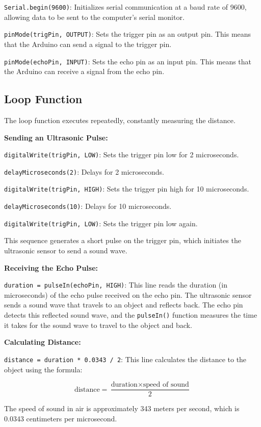 \documentclass{article}
\begin{document}
\texttt{Serial.begin(9600)}: Initializes serial communication at a baud rate of 9600, allowing data to be sent to the computer's serial monitor.

\texttt{pinMode(trigPin, OUTPUT)}: Sets the trigger pin as an output pin. This means that the Arduino can send a signal to the trigger pin.

\texttt{pinMode(echoPin, INPUT)}: Sets the echo pin as an input pin. This means that the Arduino can receive a signal from the echo pin.

\subsection{Loop Function}

The loop function executes repeatedly, constantly measuring the distance.

\textbf{Sending an Ultrasonic Pulse:}

\texttt{digitalWrite(trigPin, LOW)}: Sets the trigger pin low for 2 microseconds.

\texttt{delayMicroseconds(2)}: Delays for 2 microseconds.

\texttt{digitalWrite(trigPin, HIGH)}: Sets the trigger pin high for 10 microseconds.

\texttt{delayMicroseconds(10)}: Delays for 10 microseconds.

\texttt{digitalWrite(trigPin, LOW)}: Sets the trigger pin low again.

This sequence generates a short pulse on the trigger pin, which initiates the ultrasonic sensor to send a sound wave.

\textbf{Receiving the Echo Pulse:}

\texttt{duration = pulseIn(echoPin, HIGH)}: This line reads the duration (in microseconds) of the echo pulse received on the echo pin. The ultrasonic sensor sends a sound wave that travels to an object and reflects back. The echo pin detects this reflected sound wave, and the \texttt{pulseIn()} function measures the time it takes for the sound wave to travel to the object and back.

\textbf{Calculating Distance:}

\texttt{distance = duration * 0.0343 / 2}: This line calculates the distance to the object using the formula:

\[
\text{distance} = \frac{\text{duration} \times \text{speed of sound}}{2}
\]

The speed of sound in air is approximately 343 meters per second, which is 0.0343 centimeters per microsecond.
\end{document}
